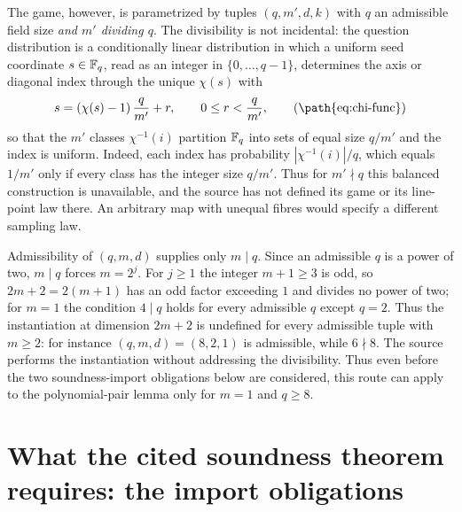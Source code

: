 \documentclass[11pt]{article}
\begin{document}
The game, however, is parametrized by tuples $(q,m',d,k)$ with $q$ an
admissible field size \emph{and $m'$ dividing $q$}.  The divisibility is not
incidental: the question distribution is a conditionally linear distribution
in which a uniform seed coordinate $s \in \mathbb{F}_q$, read as an integer in
$\{0,\ldots,q-1\}$, determines the axis or diagonal index through the unique
$\chi(s)$ with
\[
  s = (\chi(s)-1)\,\frac{q}{m'} + r, \qquad 0 \le r < \frac{q}{m'},
  \tag{\path{eq:chi-func}}
\]
so that the $m'$ classes $\chi^{-1}(i)$ partition $\mathbb{F}_q$ into sets of equal
size $q/m'$ and the index is uniform. Indeed, each index has probability
$|\chi^{-1}(i)|/q$, which equals $1/m'$ only if every class has the integer
size $q/m'$. Thus for $m'\nmid q$ this balanced construction is unavailable,
and the source has not defined its game or its line-point law there. An
arbitrary map with unequal fibres would specify a different sampling law.

Admissibility of $(q,m,d)$ supplies only $m \mid q$.  Since an admissible $q$
is a power of two, $m \mid q$ forces $m = 2^j$.  For $j \ge 1$ the integer
$m+1 \ge 3$ is odd, so $2m+2 = 2(m+1)$ has an odd factor exceeding $1$ and
divides no power of two; for $m = 1$ the condition $4 \mid q$ holds for every
admissible $q$ except $q = 2$.  Thus the instantiation at dimension $2m+2$ is
undefined for every admissible tuple with $m \ge 2$: for instance
$(q,m,d) = (8,2,1)$ is admissible, while $6 \nmid 8$.  The source performs
the instantiation without addressing the divisibility.  Thus even before the
two soundness-import obligations below are considered, this route can apply to
the polynomial-pair lemma only for $m = 1$ and $q \ge 8$.

\section{What the cited soundness theorem requires: the import obligations}
\label{sec:import-obligations}
\end{document}
